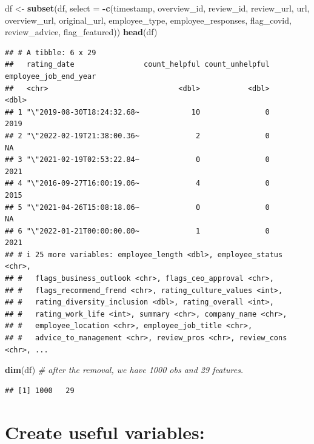 \documentclass[
]{article}
\newenvironment{Shaded}{\begin{snugshade}}{\end{snugshade}}
\newcommand{\AttributeTok}[1]{\textcolor[rgb]{0.13,0.29,0.53}{#1}}
\newcommand{\CommentTok}[1]{\textcolor[rgb]{0.56,0.35,0.01}{\textit{#1}}}
\newcommand{\FunctionTok}[1]{\textcolor[rgb]{0.13,0.29,0.53}{\textbf{#1}}}
\newcommand{\NormalTok}[1]{#1}
\newcommand{\OtherTok}[1]{\textcolor[rgb]{0.56,0.35,0.01}{#1}}
\newcommand{\SpecialCharTok}[1]{\textcolor[rgb]{0.81,0.36,0.00}{\textbf{#1}}}
\begin{document}
\begin{Shaded}
\begin{Highlighting}[]
\NormalTok{df }\OtherTok{\textless{}{-}} \FunctionTok{subset}\NormalTok{(df, }\AttributeTok{select =} \SpecialCharTok{{-}}\FunctionTok{c}\NormalTok{(timestamp, overview\_id, review\_id, review\_url, url, overview\_url, original\_url, employee\_type, employee\_responses, flag\_covid, review\_advice, flag\_featured))}
\FunctionTok{head}\NormalTok{(df)}
\end{Highlighting}
\end{Shaded}

\begin{verbatim}
## # A tibble: 6 x 29
##   rating_date                count_helpful count_unhelpful employee_job_end_year
##   <chr>                              <dbl>           <dbl>                 <dbl>
## 1 "\"2019-08-30T18:24:32.68~            10               0                  2019
## 2 "\"2022-02-19T21:38:00.36~             2               0                    NA
## 3 "\"2021-02-19T02:53:22.84~             0               0                  2021
## 4 "\"2016-09-27T16:00:19.06~             4               0                  2015
## 5 "\"2021-04-26T15:08:18.06~             0               0                    NA
## 6 "\"2022-01-21T00:00:00.00~             1               0                  2021
## # i 25 more variables: employee_length <dbl>, employee_status <chr>,
## #   flags_business_outlook <chr>, flags_ceo_approval <chr>,
## #   flags_recommend_frend <chr>, rating_culture_values <int>,
## #   rating_diversity_inclusion <dbl>, rating_overall <int>,
## #   rating_work_life <int>, summary <chr>, company_name <chr>,
## #   employee_location <chr>, employee_job_title <chr>,
## #   advice_to_management <chr>, review_pros <chr>, review_cons <chr>, ...
\end{verbatim}

\begin{Shaded}
\begin{Highlighting}[]
\FunctionTok{dim}\NormalTok{(df) }\CommentTok{\# after the removal, we have 1000 obs and 29 features. }
\end{Highlighting}
\end{Shaded}

\begin{verbatim}
## [1] 1000   29
\end{verbatim}

\section{Create useful variables:}\label{create-useful-variables}
\end{document}
